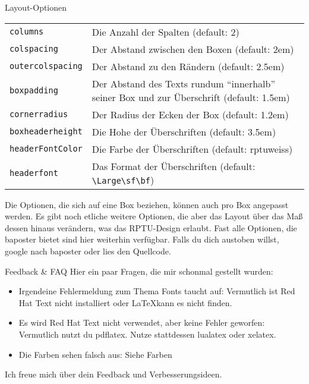 \documentclass[
  a0paper,
  portrait,
  fontscale=.35 %
  ]{baposterrptu}
\begin{document}
\begin{poster}
\begin{posterbox}[name=layout, below=farben, column=1]{Layout-Optionen}
    \begin{center}
      \begin{tabular}{lp{}}
        \lstinline!columns!         & Die Anzahl der Spalten (default: 2)                                                        \\
        \lstinline!colspacing!      & Der Abstand zwischen den Boxen (default: 2em)                                              \\
        \lstinline!outercolspacing! & Der Abstand zu den Rändern (default: 2.5em)                                                \\
        \lstinline!boxpadding!      & Der Abstand des Texts rundum "`innerhalb"' seiner Box und zur Überschrift (default: 1.5em) \\
        \lstinline!cornerradius!    & Der Radius der Ecken der Box (default: 1.2em)                                              \\
        \lstinline!boxheaderheight! & Die Hohe der Überschriften (default: 3.5em)                                                \\
        \lstinline!headerFontColor! & Die Farbe der Überschriften (default: rptuweiss)                                           \\
        \lstinline!headerfont!      & Das Format der Überschriften (default: \lstinline!\Large\sf\bf!)
      \end{tabular}
    \end{center}
    Die Optionen, die sich auf eine Box beziehen, können auch pro Box angepasst werden. Es gibt noch etliche weitere Optionen, die aber das Layout über das Maß dessen hinaus verändern, was das RPTU-Design erlaubt. Fast alle Optionen, die baposter bietet sind hier weiterhin verfügbar. Falls du dich austoben willst, google nach baposter oder lies den Quellcode.
  \end{posterbox}

  \begin{posterbox}[above=bottom, below=layout, column=1]{Feedback \& FAQ}
    Hier ein paar Fragen, die mir schonmal gestellt wurden:
    \begin{itemize}
      \item Irgendeine Fehlermeldung zum Thema Fonts taucht auf: Vermutlich ist Red Hat Text nicht installiert oder \LaTeX kann es nicht finden.
      \item Es wird Red Hat Text nicht verwendet, aber keine Fehler geworfen: Vermutlich nutzt du pdflatex. Nutze stattdessen lualatex oder xelatex.
      \item Die Farben sehen falsch aus: Siehe Farben
    \end{itemize}
    Ich freue mich über dein Feedback und Verbesserungsideen.
  \end{posterbox}

\end{poster}
\end{document}
